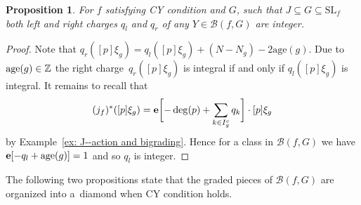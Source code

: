 \documentclass[pdftex]{sigma}
\numberwithin{equation}{section}
\newtheorem{Proposition}[Theorem]{Proposition}
 { \theoremstyle{definition}
\newtheorem{Definition}[Theorem]{Definition}
\newtheorem{Note}[Theorem]{Note}
\newtheorem{Example}[Theorem]{Example}
\newtheorem{Remark}[Theorem]{Remark} }
\newcommand{\ZZ}{{\mathbb{Z}}}
\newcommand{\SL}{{\mathrm{SL}}}
\newcommand{\epi}{{\bf e}}
\newcommand{\age}{\mathrm{age}}
\def\B{{\mathcal B}}
\begin{document}
\begin{Proposition}
	For $f$ satisfying CY condition and $G$, such that $J \subseteq G \subseteq \SL_f$ both left and right charges $q_l$ and $q_r$ of any $Y \in \B(f,G)$ are integer.
\end{Proposition}
\begin{proof}
	Note that $q_r([p]\xi_g) = q_l([p]\xi_g) + (N-N_g) - 2 \age(g)$. Due to ${\rm age}(g)\in\ZZ$ the right charge~$q_r([p]\xi_g)$ is integral if and only if $q_l([p]\xi_g)$ is integral.
 It remains to recall that
 \[
 (j_f)^*([p]\xi_g)=\epi\biggl[-\deg(p) + \sum_{k \in I_g^c} q_k\biggr]\cdot [p]\xi_g
 \]
 by Example~\ref{ex: J--action and bigrading}. Hence for a class in $\B(f,G)$ we have $\epi[-q_l+\age(g)]=1$ and so $q_l$ is integer.
\end{proof}

The following two propositions state that the graded pieces of $\B(f,G)$ are organized into a~diamond when CY condition holds.
\end{document}
